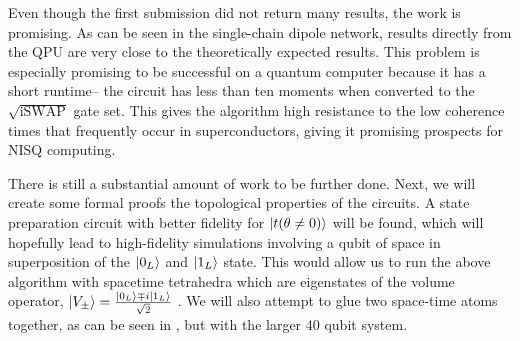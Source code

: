\documentclass[a4paper,11pt,aps,tightenlines,nofootinbib]{revtex4}
\begin{document}
        Even though the first submission did not return many results, the work is promising. As can be seen in the single-chain 
        dipole network, results directly from the QPU are very close to the theoretically expected results. This 
        problem is especially promising to be successful on a quantum computer because it has a short runtime--
        the circuit has less than ten moments when converted to the $\sqrt{\text{iSWAP}}$ gate set. This gives the algorithm 
        high resistance to the low coherence times that frequently occur in superconductors, giving it promising prospects for NISQ computing.

        There is still a substantial amount of work to be further done. Next, we will create some formal proofs  
        the topological properties of the circuits. A state preparation circuit with better fidelity for $\ket{t(\theta\neq0)}$ 
        will be found, which will hopefully lead to high-fidelity simulations involving a qubit of space in 
        superposition of the $\ket{0_L}$ and $\ket{1_L}$ state. This would allow us to run the above algorithm with 
        spacetime tetrahedra which are eigenstates of the volume operator, $\ket{V_\pm} = \frac{\ket{0_L}\mp i\ket{1_L}}{\sqrt{2}}$ \cite{covariant-lqg}.
        We will also attempt to glue two space-time atoms together, as can be seen in \cite{two-vertex-sfa}, but with the larger 40 qubit system.


        
\end{document}
